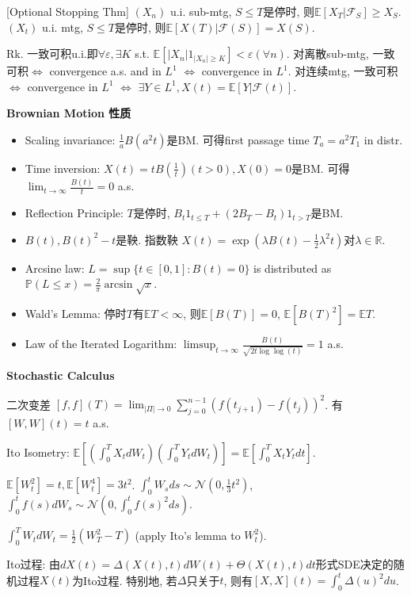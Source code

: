\documentclass[UTF8]{ctexart}
\begin{document}
[Optional Stopping Thm] $(X_n)$ u.i. sub-mtg, $S\leq T$是停时, 则$\mathbb{E}[X_T|\mathcal{F}_S]\geq X_S$.
$(X_t)$ u.i. mtg, $S\leq T$是停时, 则$\mathbb{E}[X(T)|\mathcal{F}(S)]=X(S)$.

Rk. 一致可积u.i.即$\forall \varepsilon, \exists K$ s.t. $\mathbb{E}[|X_n|1_{|X_n|\geq K}]<\varepsilon (\forall n)$.
对离散sub-mtg, 一致可积$\Leftrightarrow$ convergence a.s. and in $L^1$  $\Leftrightarrow$ convergence in $L^1$.
对连续mtg, 一致可积$\Leftrightarrow$ convergence in $L^1$  $\Leftrightarrow$ $\exists Y\in L^1, X(t)=\mathbb{E}[Y|\mathcal{F}(t)]$.


\noindent \textbf{Brownian Motion 性质}
\begin{itemize}
	\item Scaling invariance: $\frac{1}{a} B(a^2t)$是BM. 可得first passage time $T_a=a^2 T_1$ in distr.
	\item Time inversion: $X(t)=tB(\frac{1}{t})(t>0),X(0)=0$是BM. 可得 $\lim_{t\to\infty}\frac{B(t)}{t}=0$ a.s.
	\item Reflection Principle: $T$是停时, $B_t1_{t\leq T}+(2B_T-B_t)1_{t>T}$是BM.
	\item $B(t), B(t)^2-t$是鞅. 指数鞅 $X(t)=\exp(\lambda B(t)-\frac12 \lambda^2 t)$对$\lambda\in\mathbb{R}$.
	\item Arcsine law: $L=\sup \{t\in[0,1]:B(t)=0\}$ is distributed as $\mathbb{P}(L\leq x)=\frac{2}{\pi}\arcsin\sqrt{x}$.
	\item Wald's Lemma: 停时$T$有$\mathbb{E}T <\infty$, 则$\mathbb{E}[B(T)]=0$, $\mathbb{E}[B(T)^2]=\mathbb{E}T$.
	\item Law of the Iterated Logarithm: $\limsup _{t \rightarrow \infty} \frac{B(t)}{\sqrt{2 t \log \log (t)}}=1$ a.s.
\end{itemize}


\noindent \textbf{Stochastic Calculus}

二次变差 $[f,f](T)=\lim_{|\Pi|\to 0} \sum_{j=0}^{n-1}(f(t_{j+1})-f(t_j))^2$. 有 $[W,W](t)=t$ a.s.

Ito Isometry: $\mathbb{E}\left[ (\int_0^T X_t dW_t)(\int_0^T Y_t dW_t) \right]
	=\mathbb{E}\left[ \int_0^T X_t Y_t dt \right]$.

$\mathbb{E}[W_t^2]=t, \mathbb{E}[W_t^4]=3t^2$.
$\int_0^t W_s ds \sim \mathcal{N}(0,\frac13 t^2)$,
$\int_0^t f(s) dW_s \sim \mathcal{N}\left(0,\int_0^t f(s)^2 ds\right)$.

$\int_0^T W_tdW_t = \frac12 (W_T^2-T)$ (apply Ito's lemma to $W_t^2$).

Ito过程: 由$dX(t)=\Delta(X(t),t)dW(t)+\Theta(X(t),t)dt$形式SDE决定的随机过程$X(t)$为Ito过程.
特别地, 若$\Delta$只关于$t$, 则有$[X,X](t)=\int_0^t \Delta(u)^2 du$.
\end{document}
